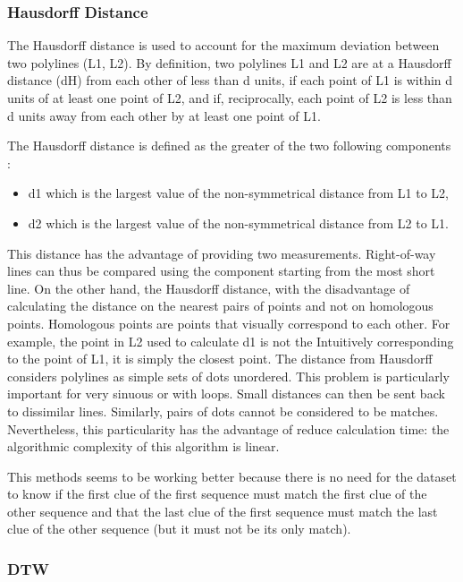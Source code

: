 \documentclass{article}
\begin{document}
\subsubsection{Hausdorff Distance }
The Hausdorff distance is used to account for the maximum deviation between two polylines (L1, L2). By definition, two polylines L1 and L2 are at a Hausdorff distance (dH) from each other of less than d units, if each point of L1 is within d units of at least one point of L2, and if, reciprocally, each point of L2 is less than d units away from each other by at least one
point of L1.

The Hausdorff distance is defined as the greater of the two following components :

\begin{itemize}
    \item d1 which is the largest value of the non-symmetrical distance from L1 to L2,
    \item d2 which is the largest value of the non-symmetrical distance from L2 to L1.
\end{itemize}


This distance has the advantage of providing two measurements. Right-of-way lines can thus be compared using the component starting from the most short line. On the other hand, the Hausdorff distance, with the disadvantage of calculating the
distance on the nearest pairs of points and not on homologous points. Homologous points are points that visually correspond to each other. For example, the point in L2 used to calculate d1 is not the Intuitively corresponding to the point of L1, it is simply the closest point. The distance from Hausdorff considers polylines as simple sets of dots unordered. This problem is particularly important for very sinuous or with loops. Small distances can then be sent back to dissimilar lines. Similarly, pairs of dots cannot be considered to be matches. Nevertheless, this particularity has the advantage of
reduce calculation time: the algorithmic complexity of this algorithm is linear. 

This methods seems to be working better because there is no need for the dataset to know if the first clue of the first sequence must match the first clue of the other sequence and that
the last clue of the first sequence must match the last clue of the other sequence (but it must not be its only match).

\subsubsection{DTW}
\end{document}
